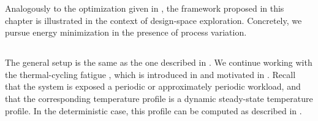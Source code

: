 Analogously to the optimization given in , the
framework proposed in this chapter is illustrated in the context of design-space
exploration. Concretely, we pursue energy minimization in the presence of
process variation.

\subsection{\problemtitle}

The general setup is the same as the one described in
. We continue working with the thermal-cycling
fatigue \cite{jedec2016}, which is introduced in 
and motivated in . Recall that the system is exposed a
periodic or approximately periodic workload, and that the corresponding
temperature profile is a dynamic steady-state temperature profile. In the
deterministic case, this profile can be computed as described in
.

